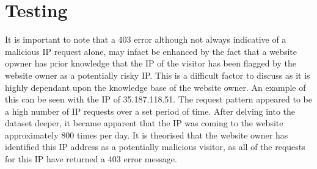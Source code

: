 \section{Testing}

It is important to note that a 403 error although not always indicative of a malicious IP request alone, may infact be enhanced by the fact that a website opwner has prior knowledge that the IP of the visitor has been flagged by the website owner as a potentially risky IP. This is a difficult factor to discuss as it is highly dependant upon the knowledge base of the website owner. An example of this can be seen with the IP of 35.187.118.51. The request pattern appeared to be a high number of IP requests over a set period of time. After delving into the dataset deeper, it became apparent that the IP was coming to the website approximately 800 times per day. It is theorised that the website owner has identified this IP address as a potentially malicious visitor, as all of the requests for this IP have returned a 403 error message.